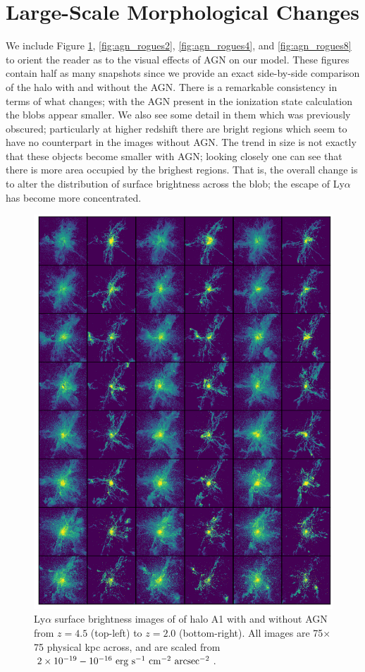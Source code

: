\section{Large-Scale Morphological Changes}
We include Figure \ref{fig:agn_rogues1}, \ref{fig:agn_rogues2}, \ref{fig:agn_rogues4}, and \ref{fig:agn_rogues8} to orient the reader as to the visual effects of AGN on our model.
These figures contain half as many snapshots since we provide an exact side-by-side comparison of the halo with and without the AGN.
There is a remarkable consistency in terms of what changes; with the AGN present in the ionization state calculation the blobs appear smaller.
We also see some detail in them which was previously obscured; particularly at higher redshift there are bright regions which seem to have no counterpart in the images without AGN.
The trend in size is not exactly that these objects become smaller with AGN; looking closely one can see that there is more area occupied by the brighest regions.
That is, the overall change is to alter the distribution of surface brightness across the blob; the escape of Ly$\alpha$ has become more concentrated.

\begin{figure}
    \centering
    \includegraphics[width=\textwidth,keepaspectratio]{figures/agn_rogues_A1.png}
    \caption{
        Ly$\alpha$ surface brightness images of of halo A1 with and without AGN from $z=4.5$ (top-left) to $z=2.0$ (bottom-right).
        All images are 75$\times$75 physical kpc across, and are scaled from $2\times 10^{-19}-10^{-16}\ \rm{erg}\ \rm{s}^{-1}\ \rm{cm}^{-2}\ \rm{arcsec}^{-2}$.
    }
  \label{fig:agn_rogues1}
\end{figure}

